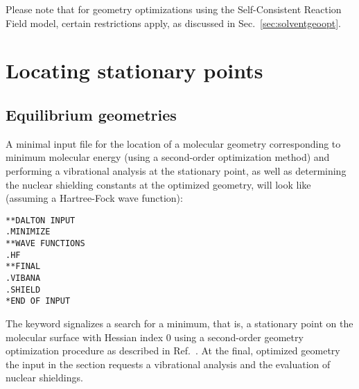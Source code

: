 Please note that for geometry optimizations using the Self-Consistent
Reaction Field model, certain restrictions apply, as discussed in
Sec.~\ref{sec:solventgeoopt}. 

\section{Locating stationary points}

\subsection{Equilibrium geometries}
\label{sec:minimization}

\begin{center}
\end{center}

A minimal input file for the location of a molecular geometry
corresponding to minimum molecular energy
(using a second-order optimization
method) and performing a vibrational 
analysis at the stationary point, as well
as determining the nuclear 
shielding constants at the optimized
geometry, will look like 
(assuming a Hartree-Fock wave function):

\begin{verbatim}
**DALTON INPUT
.MINIMIZE
**WAVE FUNCTIONS
.HF
**FINAL
.VIBANA
.SHIELD
*END OF INPUT
\end{verbatim}

The keyword  signalizes a search for a minimum, that is,
a stationary point on the molecular surface with Hessian index 0 using
a second-order geometry optimization procedure as described in
Ref.~\cite{tuhjahjajpjjcp84}. At 
the final, optimized geometry the input in the  section requests
a vibrational analysis and the evaluation of nuclear shieldings.

